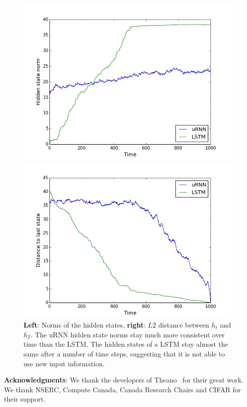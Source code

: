 \documentclass{article} %
\begin{document}
  
   




\begin{figure}[t!] 
\label{fig:saturation} 
\begin{minipage}[b]{0.5\linewidth}
  \centering
  \includegraphics[scale=0.25]{figures/hnorms.jpeg}
\end{minipage}%
\begin{minipage}[b]{0.5\linewidth}
  \centering
  \includegraphics[scale=0.25]{figures/hdiff.jpeg}
\end{minipage}
\caption{\textbf{Left}: Norms of the hidden states, \textbf{right}: $L2$ distance between $h_t$ and $h_T$.
	The uRNN hidden state norms stay much more consistent over time than the LSTM. 
        The hidden states of a LSTM stay almost the same after a number of time steps, 
        suggesting that it is not able to use new input information.}
\end{figure}


{\bf Acknowledgments}: We thank the developers of
Theano~\cite{Fred2010} for %
their great work. We thank NSERC, Compute Canada, Canada Research Chairs and CIFAR for their support.



\end{document}
